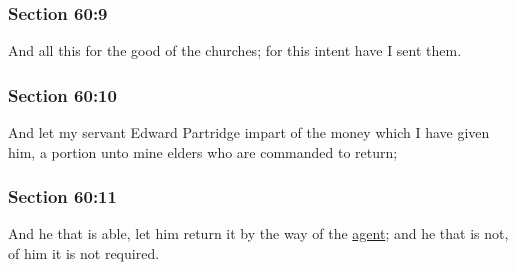	\subsubsection{Section 60:9} %
		\label{DC60-9}

		And all this for the good of the churches; for this intent have I sent them.


	\subsubsection{Section 60:10} %
		\label{DC60-10}

		And let my servant Edward Partridge impart of the money which I have given him, a portion unto mine elders who are commanded to return;


	\subsubsection{Section 60:11} %
		\label{DC60-11}

		And he that is able, let him return it by the way of the \hyperref[AGENCY]{agent}; and he that is not, of him it is not required.


